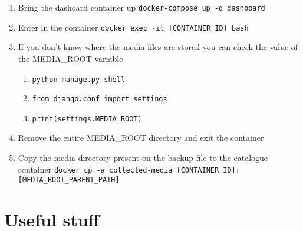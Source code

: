 \documentclass[
]{book}
\begin{document}
\begin{enumerate}
\begin{enumerate}
    \begin{enumerate}
    \def\labelenumiii{\arabic{enumiii}.}
    \item
      Bring the dashoard container up \texttt{docker-compose\ up\ -d\ dashboard}
    \item
      Enter in the container \texttt{docker\ exec\ -it\ {[}CONTAINER\_ID{]}\ bash}
    \item
      If you don't know where the media files are stored you can check the value of the MEDIA\_ROOT variable

      \begin{enumerate}
      \def\labelenumiv{\arabic{enumiv}.}
      \item
        \texttt{python\ manage.py\ shell}
      \item
        \texttt{from\ django.conf\ import\ settings}
      \item
        \texttt{print(settings.MEDIA\_ROOT)}
      \end{enumerate}
    \item
      Remove the entire MEDIA\_ROOT directory and exit the container
    \item
      Copy the media directory present on the backup file to the catalogue container \texttt{docker\ cp\ -a\ collected-media\ {[}CONTAINER\_ID{]}:{[}MEDIA\_ROOT\_PARENT\_PATH{]}}
    \end{enumerate}
  \end{enumerate}
\end{enumerate}

\hypertarget{useful-stuff}{%
\section{Useful stuff}\label{useful-stuff}}
\end{document}
